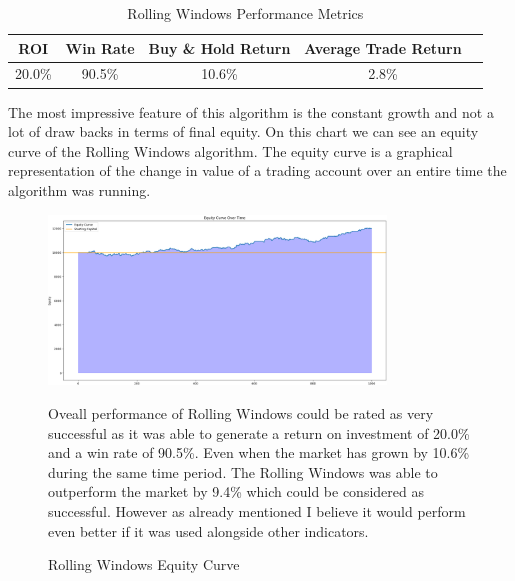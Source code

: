 \documentclass{imc-inf}
\begin{document}
				\begin{table}[h!]
					\centering
					\begin{tabular}{|c|c|c|c|c|}
						\hline
						\textbf{ROI} & \textbf{Win Rate} & \textbf{Buy \& Hold Return} & \textbf{Average Trade Return} \\ \hline
						20.0\%         & 90.5\%               & 10.6\%                         & 2.8\%                           \\ \hline
					\end{tabular}
					\caption{Rolling Windows Performance Metrics}
					\label{tab:rolling_windows_performance_metrics}
				\end{table}
				The most impressive feature of this algorithm is the constant growth and not a lot of draw backs in terms of final equity.
				On this chart we can see an equity curve of the Rolling Windows algorithm. The equity curve is a graphical representation of the change in value of a trading account over an entire
				time the algorithm was running.
				\begin{figure}[h!]
					\centering
					\includegraphics[width=0.8\textwidth]{rolling_windows_equity_curve.png}
					\caption{Rolling Windows Equity Curve}
					\label{fig:rolling_windows_equity_curve}
				Oveall performance of Rolling Windows could be rated as very successful as it was able to generate a return on investment of 20.0\% and a win rate of 90.5\%. 
				Even when the market has grown by 10.6\% during the same time period. The Rolling Windows was able to outperform the market by 9.4\% which could be considered as successful.
				However as already mentioned I believe it would perform even better if it was used alongside other indicators.
				\end{figure}
\end{document}
